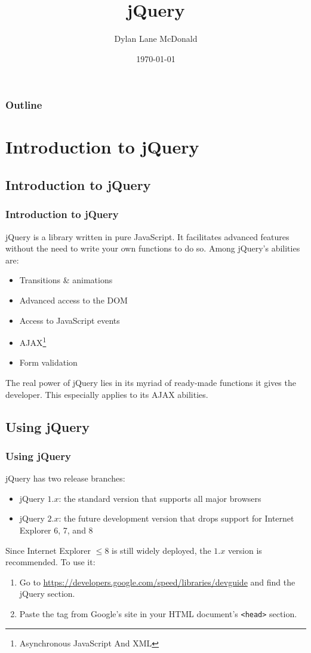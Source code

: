 \documentclass[aspectratio=169]{beamer}
\title{jQuery}
\author{Dylan Lane McDonald}
\institute{CNM STEMulus Center\\Web Development with PHP}
\date{\today}
\begin{document}
\lstset{language=Java}
\begin{frame}
\titlepage
\end{frame}

\begin{frame}
\frametitle{Outline}
\tableofcontents
\end{frame}

\section{Introduction to jQuery}
\subsection{Introduction to jQuery}
\begin{frame}
\frametitle{Introduction to jQuery}
jQuery is a library written in pure JavaScript. It facilitates advanced features without the need to write your own functions to do so. Among jQuery's abilities are:
\begin{itemize}
	\item Transitions \& animations
	\item Advanced access to the DOM
	\item Access to JavaScript events
	\item AJAX\footnote{Asynchronous JavaScript And XML}
	\item Form validation
\end{itemize}
The real power of jQuery lies in its myriad of ready-made functions it gives the developer. This especially applies to its AJAX abilities.
\end{frame}


\subsection{Using jQuery}
\begin{frame}
\frametitle{Using jQuery}
jQuery has two release branches:
\begin{itemize}
	\item jQuery $1.x$: the standard version that supports all major browsers
	\item jQuery $2.x$: the future development version that drops support for Internet Explorer 6, 7, and 8
\end{itemize}
Since Internet Explorer $\le 8$ is still widely deployed, the $1.x$ version is recommended. To use it:
\begin{enumerate}
	\item Go to \url{https://developers.google.com/speed/libraries/devguide} and find the jQuery section.
	\item Paste the tag from Google's site in your HTML document's \texttt{<head>} section.
\end{enumerate}
\end{frame}
\end{document}
